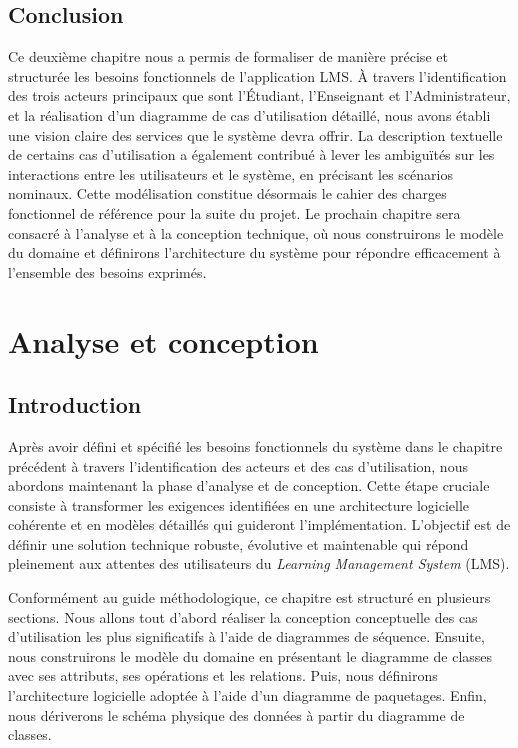 \documentclass[12pt,a4paper]{report}
\begin{document}
\section{Conclusion}
Ce deuxième chapitre nous a permis de formaliser de manière précise et structurée les besoins fonctionnels de l'application LMS. À travers l'identification des trois acteurs principaux que sont l'Étudiant, l'Enseignant et l'Administrateur, et la réalisation d'un diagramme de cas d'utilisation détaillé, nous avons établi une vision claire des services que le système devra offrir. La description textuelle de certains cas d'utilisation a également contribué à lever les ambiguïtés sur les interactions entre les utilisateurs et le système, en précisant les scénarios nominaux. Cette modélisation constitue désormais le cahier des charges fonctionnel de référence pour la suite du projet. Le prochain chapitre sera consacré à l'analyse et à la conception technique, où nous construirons le modèle du domaine et définirons l'architecture du système pour répondre efficacement à l'ensemble des besoins exprimés.

\chapter{Analyse et conception}

\section{Introduction}
Après avoir défini et spécifié les besoins fonctionnels du système dans le chapitre précédent à travers l'identification des acteurs et des cas d'utilisation, nous abordons maintenant la phase d'analyse et de conception. Cette étape cruciale consiste à transformer les exigences identifiées en une architecture logicielle cohérente et en modèles détaillés qui guideront l'implémentation. L'objectif est de définir une solution technique robuste, évolutive et maintenable qui répond pleinement aux attentes des utilisateurs du \textit{Learning Management System} (LMS).

Conformément au guide méthodologique, ce chapitre est structuré en plusieurs sections. Nous allons tout d'abord réaliser la conception conceptuelle des cas d'utilisation les plus significatifs à l'aide de diagrammes de séquence. Ensuite, nous construirons le modèle du domaine en présentant le diagramme de classes avec ses attributs, ses opérations et les relations. Puis, nous définirons l'architecture logicielle adoptée à l'aide d'un diagramme de paquetages. Enfin, nous dériverons le schéma physique des données à partir du diagramme de classes.
\end{document}
